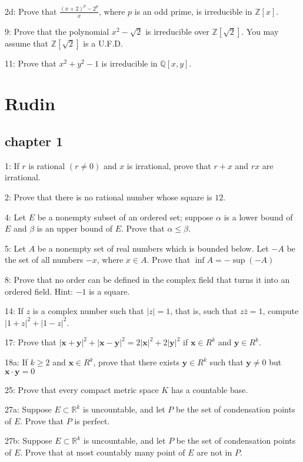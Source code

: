 \documentclass{article}
\begin{document}
2d: Prove that $\frac{(x+2)^p-2^p}{x}$, where $p$ is an odd prime, is irreducible in $\mathbb{Z}[x]$. 

9: Prove that the polynomial $x^{2}-\sqrt{2}$ is irreducible over $\mathbb{Z}[\sqrt{2}]$. You may assume that $\mathbb{Z}[\sqrt{2}]$ is a U.F.D. 

11: Prove that $x^2+y^2-1$ is irreducible in $\mathbb{Q}[x,y]$. 
\section*{Rudin}
\subsection*{chapter 1}
1: If $r$ is rational $(r \neq 0)$ and $x$ is irrational, prove that $r+x$ and $r x$ are irrational.

2: Prove that there is no rational number whose square is $12$. 

4: Let $E$ be a nonempty subset of an ordered set; suppose $\alpha$ is a lower bound of $E$ and $\beta$ is an upper bound of $E$. Prove that $\alpha \leq \beta$.

5: Let $A$ be a nonempty set of real numbers which is bounded below. Let $-A$ be the set of all numbers $-x$, where $x \in A$. Prove that $\inf A=-\sup (-A)$

8: Prove that no order can be defined in the complex field that turns it into an ordered field. Hint: $-1$ is a square.

14: If $z$ is a complex number such that $|z|=1$, that is, such that $z \bar{z}=1$, compute $|1+z|^{2}+|1-z|^{2}$. 

17: Prove that
$|\mathbf{x}+\mathbf{y}|^{2}+|\mathbf{x}-\mathbf{y}|^{2}=2|\mathbf{x}|^{2}+2|\mathbf{y}|^{2}$ if $\mathbf{x} \in R^{k}$ and $\mathbf{y} \in R^{k}$.

18a: If $k \geq 2$ and $\mathbf{x} \in R^{k}$, prove that there exists $\mathbf{y} \in R^{k}$ such that $\mathbf{y} \neq 0$ but $\mathbf{x} \cdot \mathbf{y}=0$

25: Prove that every compact metric space $K$ has a countable base. 

27a: Suppose $E\subset\mathbb{R}^k$ is uncountable, and let $P$ be the set of condensation points of $E$. Prove that $P$ is perfect. 

27b: Suppose $E\subset\mathbb{R}^k$ is uncountable, and let $P$ be the set of condensation points of $E$. Prove that at most countably many point of $E$ are not in $P$. 
\end{document}
